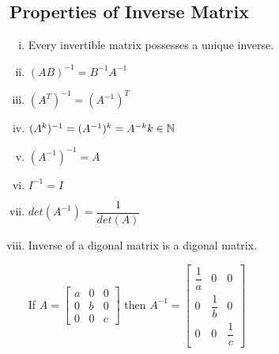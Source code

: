 \documentclass{article}
\begin{document}
\subsection{Properties of Inverse Matrix}
\begin{enumerate}[i.]
    \item Every invertible matrix possesses a unique inverse.
    \item $(AB)^{-1}=B^{-1}A^{-1}$
    \item $(A^T)^{-1}=(A^{-1})^T$
    \item $(A^k)^{-1}=(A^{-1})^k=A^{-k} \hfill k \in \mathbb{N}$
    \item $(A^{-1})^{-1}=A$
    \item $I^{-1}=I$
    \item $det(A^{-1})=\dfrac{1}{det(A)}$
    \item Inverse of a digonal matrix is a digonal matrix.

          If $A=\begin{bmatrix}
                  a & 0 & 0 \\
                  0 & b & 0 \\
                  0 & 0 & c
              \end{bmatrix}$ then $A^{-1}=\begin{bmatrix}
                  \dfrac{1}{a} & 0      & 0 \\
                  0            & \dfrac{1}{b} & 0 \\
                  0 & 0 & \dfrac{1}{c}
              \end{bmatrix}$
\end{enumerate}
\end{document}
